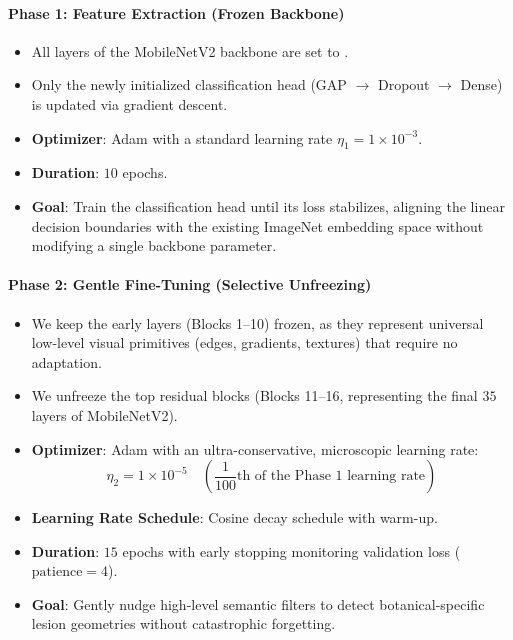 \paragraph{Phase 1: Feature Extraction (Frozen Backbone)}
\begin{itemize}
    \item All layers of the MobileNetV2 backbone are set to .
    \item Only the newly initialized classification head (GAP $\to$ Dropout $\to$ Dense) is updated via gradient descent.
    \item \textbf{Optimizer}: Adam with a standard learning rate $\eta_1 = 1 \times 10^{-3}$.
    \item \textbf{Duration}: $10$ epochs.
    \item \textbf{Goal}: Train the classification head until its loss stabilizes, aligning the linear decision boundaries with the existing ImageNet embedding space without modifying a single backbone parameter.
\end{itemize}

\paragraph{Phase 2: Gentle Fine-Tuning (Selective Unfreezing)}
\begin{itemize}
    \item We keep the early layers (Blocks 1--10) frozen, as they represent universal low-level visual primitives (edges, gradients, textures) that require no adaptation.
    \item We unfreeze the top residual blocks (Blocks 11--16, representing the final $35$ layers of MobileNetV2).
    \item \textbf{Optimizer}: Adam with an ultra-conservative, microscopic learning rate:
    \begin{equation}
    \eta_2 = 1 \times 10^{-5} \quad \left(\frac{1}{100}\text{th of the Phase 1 learning rate}\right)
    \end{equation}
    \item \textbf{Learning Rate Schedule}: Cosine decay schedule with warm-up.
    \item \textbf{Duration}: $15$ epochs with early stopping monitoring validation loss ($\text{patience} = 4$).
    \item \textbf{Goal}: Gently nudge high-level semantic filters to detect botanical-specific lesion geometries without catastrophic forgetting.
\end{itemize}

